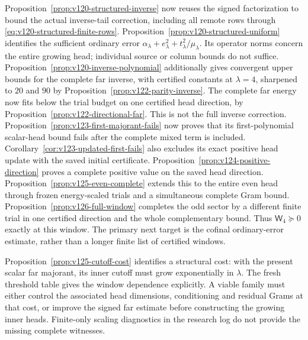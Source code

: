 \documentclass[11pt]{article}
\theoremstyle{remark}
\begin{document}
Proposition~\ref{prop:v120-structured-inverse} now reuses the signed
factorization to bound the actual inverse-tail correction, including
all remote rows through \eqref{eq:v120-structured-finite-rows}.
Proposition~\ref{prop:v120-structured-uniform} identifies the sufficient
ordinary error $\alpha_\lambda+e_\lambda^2+
 t_\lambda^2/\mu_\lambda$. Its operator norms concern the entire
growing head; individual source or column bounds do not suffice.
Proposition~\ref{prop:v120-inverse-polynomial} additionally gives
convergent upper bounds for the complete far inverse, with certified
constants at $\lambda=4$, sharpened to $20$ and $90$ by
Proposition~\ref{prop:v122-parity-inverse}. The complete far energy
now fits below the trial budget on one certified head direction,
by Proposition~\ref{prop:v122-directional-far}. This is not the full
inverse correction. Proposition~\ref{prop:v123-first-majorant-fails}
now proves that its first-polynomial scalar-head bound fails after
the complete mixed term is included. Corollary~\ref{cor:v123-updated-first-fails}
also excludes its exact positive head update with the saved initial
certificate. Proposition~\ref{prop:v124-positive-direction}
proves a complete positive value on the saved head direction.
Proposition~\ref{prop:v125-even-complete} extends this to the entire
even head through frozen energy-scaled trials and a simultaneous
complete Gram bound. Proposition~\ref{prop:v126-full-window}
completes the odd sector by a different finite trial in one
certified direction and the whole complementary bound. Thus
$\mathsf W_4\succeq0$ exactly at this window. The primary
next target is the cofinal ordinary-error estimate, rather than a
longer finite list of certified windows.

Proposition~\ref{prop:v125-cutoff-cost} identifies a structural cost:
with the present scalar far majorant, its inner cutoff must grow
exponentially in $\lambda$. The fresh threshold table gives the
window dependence explicitly. A viable family must either control
the associated head dimensions, conditioning and residual Grams at
that cost, or improve the signed far estimate before constructing
the growing inner heads. Finite-only scaling diagnostics in the
research log do not provide the missing complete witnesses.
\end{document}
